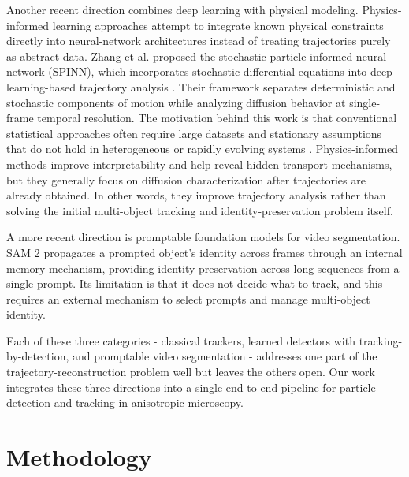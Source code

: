 \documentclass[conference]{IEEEtran}
\begin{document}
Another recent direction combines deep learning with physical modeling. Physics-informed learning approaches attempt to integrate known physical constraints directly into neural-network architectures instead of treating trajectories purely as abstract data. Zhang et al. proposed the stochastic particle-informed neural network (SPINN), which incorporates stochastic differential equations into deep-learning-based trajectory analysis \cite{zhang2025physicsinformedstochasticparticle}. Their framework separates deterministic and stochastic components of motion while analyzing diffusion behavior at single-frame temporal resolution. The motivation behind this work is that conventional statistical approaches often require large datasets and stationary assumptions that do not hold in heterogeneous or rapidly evolving systems \cite{zhang2025physicsinformedstochasticparticle}. Physics-informed methods improve interpretability and help reveal hidden transport mechanisms, but they generally focus on diffusion characterization after trajectories are already obtained. In other words, they improve trajectory analysis rather than solving the initial multi-object tracking and identity-preservation problem itself.

A more recent direction is promptable foundation models for video segmentation. SAM 2 \cite{ravi2025_sam2} propagates a prompted object's identity across frames through an internal memory mechanism, providing identity preservation across long sequences from a single prompt. Its limitation is that it does not decide what to track, and this requires an external mechanism to select prompts and manage multi-object identity.

Each of these three categories - classical trackers, learned detectors with tracking-by-detection, and promptable video segmentation - addresses one part of the trajectory-reconstruction problem well but leaves the others open. Our work integrates these three directions into a single end-to-end pipeline for particle detection and tracking in anisotropic microscopy.

\section{Methodology}
\end{document}
